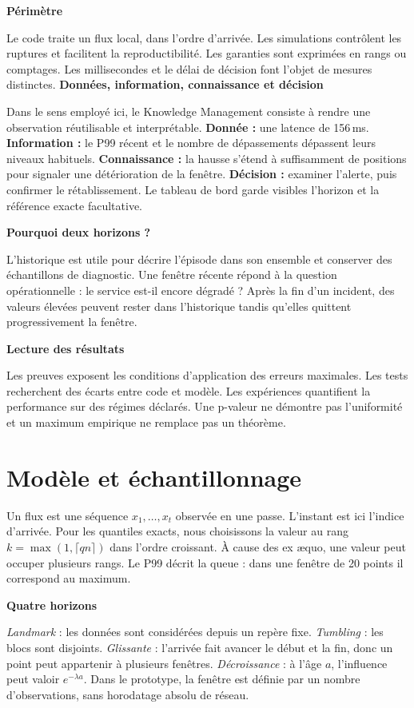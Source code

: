 \documentclass[11pt,a4paper,twocolumn]{article}
\newcommand{\topic}[1]{\textbf{\color{navy}#1}\par}
\newcommand{\columnbreak}{\newpage}
\begin{document}
\topic{Périmètre}
Le code traite un flux local, dans l’ordre d’arrivée. Les simulations contrôlent les ruptures et facilitent la reproductibilité. Les garanties sont exprimées en rangs ou comptages. Les millisecondes et le délai de décision font l’objet de mesures distinctes.
\columnbreak
\topic{Données, information, connaissance et décision}
Dans le sens employé ici, le Knowledge Management consiste à rendre une observation réutilisable et interprétable. \textbf{Donnée :} une latence de 156\,ms. \textbf{Information :} le P99 récent et le nombre de dépassements dépassent leurs niveaux habituels. \textbf{Connaissance :} la hausse s’étend à suffisamment de positions pour signaler une détérioration de la fenêtre. \textbf{Décision :} examiner l’alerte, puis confirmer le rétablissement. Le tableau de bord garde visibles l’horizon et la référence exacte facultative.

\topic{Pourquoi deux horizons ?}
L’historique est utile pour décrire l’épisode dans son ensemble et conserver des échantillons de diagnostic. Une fenêtre récente répond à la question opérationnelle : le service est-il encore dégradé ? Après la fin d’un incident, des valeurs élevées peuvent rester dans l’historique tandis qu’elles quittent progressivement la fenêtre.

\topic{Lecture des résultats}
Les preuves exposent les conditions d’application des erreurs maximales. Les tests recherchent des écarts entre code et modèle. Les expériences quantifient la performance sur des régimes déclarés. Une p-valeur ne démontre pas l’uniformité et un maximum empirique ne remplace pas un théorème.
\clearpage
\section{Modèle et échantillonnage}
Un flux est une séquence $x_1,\dots,x_t$ observée en une passe. L’instant est ici l’indice d’arrivée. Pour les quantiles exacts, nous choisissons la valeur au rang $k=\max(1,\lceil qn\rceil)$ dans l’ordre croissant. À cause des ex æquo, une valeur peut occuper plusieurs rangs. Le P99 décrit la queue : dans une fenêtre de 20 points il correspond au maximum.

\topic{Quatre horizons}
\emph{Landmark} : les données sont considérées depuis un repère fixe. \emph{Tumbling} : les blocs sont disjoints. \emph{Glissante} : l’arrivée fait avancer le début et la fin, donc un point peut appartenir à plusieurs fenêtres. \emph{Décroissance} : à l’âge $a$, l’influence peut valoir $e^{-\lambda a}$. Dans le prototype, la fenêtre est définie par un nombre d’observations, sans horodatage absolu de réseau.
\end{document}

